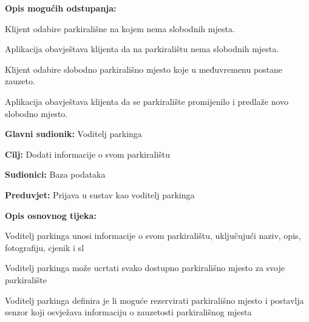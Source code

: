 {\begin{packed_item}
\begin{packed_enum}
	\end{packed_enum}
	
	\item  \textbf{Opis mogućih odstupanja:}
	
	\item[] \begin{packed_item}
		
		\item[2.a] Klijent odabire parkirališne na kojem nema slobodnih mjesta.
		\item[] \begin{packed_enum}
			
			\item Aplikacija obavještava klijenta da na parkiralištu nema slobodnih mjesta.
			
		\end{packed_enum}
		
		\item[3.a] Klijent odabire slobodno parkirališno mjesto koje u međuvremenu postane zauzeto.
		\item[] \begin{packed_enum}
			
			\item Aplikacija obavještava klijenta da se parkiralište promijenilo i predlaže novo slobodno mjesto.
			
		\end{packed_enum}
		
	\end{packed_item}

\end{packed_item}

\noindent {}
\begin{packed_item}
	
	\item \textbf{Glavni sudionik: }Voditelj parkinga
	\item  \textbf{Cilj:} Dodati informacije o svom parkiralištu
	\item  \textbf{Sudionici:} Baza podataka
	\item  \textbf{Preduvjet:} Prijava u sustav kao voditelj parkinga
	\item  \textbf{Opis osnovnog tijeka:}
	
	\item[] \begin{packed_enum}
		
		\item Voditelj parkinga unosi informacije o svom parkiralištu, uključujući naziv, opis, fotografiju, cjenik i sl
		\item Voditelj parkinga može ucrtati svako dostupno parkirališno mjesto za svoje parkiralište
		\item Voditelj parkinga definira je li moguće rezervirati parkirališno mjesto i postavlja senzor koji osvježava informaciju o zauzetosti parkirališnog mjesta
		

\end{packed_enum}
\end{packed_item}}
